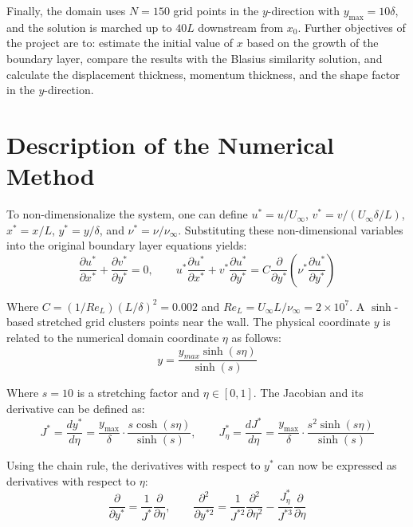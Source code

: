 \documentclass[letterpaper,12pt]{article}
\begin{document}
Finally, the domain uses $N = 150$ grid points in the $y$-direction with $y_{\max} = 10\delta$, and the solution is marched up to $40L$ downstream from $x_0$. Further objectives of the project are to: estimate the initial value of $x$ based on the growth of the boundary layer, compare the results with the Blasius similarity solution, and calculate the displacement thickness, momentum thickness, and the shape factor in the $y$-direction.

\section{Description of the Numerical Method}

To non-dimensionalize the system, one can define $u^* = u/U_\infty$, $v^* = v/(U_\infty \delta/L)$, $x^* = x/L$, $y^* = y/\delta$, and $\nu^* = \nu/\nu_\infty$. Substituting these non-dimensional variables into the original boundary layer equations yields:
\begin{equation}
    \frac{\partial u^*}{\partial x^*} + \frac{\partial v^*}{\partial y^*} = 0, \qquad
    u^* \frac{\partial u^*}{\partial x^*} + v^* \frac{\partial u^*}{\partial y^*} = C \frac{\partial}{\partial y^*}\!\left(\nu^* \frac{\partial u^*}{\partial y^*}\right) \label{eq:nd_eqs}
\end{equation}

Where $C = (1/Re_L)(L/\delta)^2 = 0.002$ and $Re_L = U_\infty L/\nu_\infty = 2 \times 10^7$. A $\sinh$-based stretched grid clusters points near the wall. The physical coordinate $y$ is related to the numerical domain coordinate $\eta$ as follows:
\begin{equation}
    y = \frac{y_{max} \sinh(s \eta)}{\sinh(s)}
\end{equation}

Where $s = 10$ is a stretching factor and $\eta \in [0,1]$. The Jacobian and its derivative can be defined as:
\begin{equation}
    J^* = \frac{dy^*}{d\eta} = \frac{y_{\max}}{\delta} \cdot \frac{s \cosh(s\eta)}{\sinh(s)}, \qquad
    J^*_\eta = \frac{dJ^*}{d\eta} = \frac{y_{\max}}{\delta} \cdot \frac{s^2 \sinh(s\eta)}{\sinh(s)}
\end{equation}

Using the chain rule, the derivatives with respect to $y^*$ can now be expressed as derivatives with respect to $\eta$:
\begin{equation}
    \frac{\partial}{\partial y^*} = \frac{1}{J^*} \frac{\partial}{\partial \eta}, \qquad
    \frac{\partial^2}{\partial y^{*2}} = \frac{1}{J^{*2}} \frac{\partial^2}{\partial \eta^2} - \frac{J^*_\eta}{J^{*3}} \frac{\partial}{\partial \eta} \label{eq:chain_rule}
\end{equation}
\end{document}
